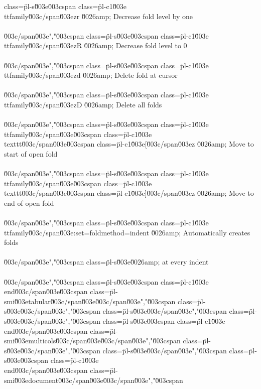 class=\"pl-s\"\u003e\u003cspan class=\"pl-c1\"\u003e\\ttfamily\u003c/span\u003e{zr} \u0026amp; Decrease fold level by one\\\\\u003c/span\u003e","\u003cspan class=\"pl-s\"\u003e\u003cspan class=\"pl-c1\"\u003e\\ttfamily\u003c/span\u003e{zR} \u0026amp; Decrease fold level to 0\\\\\u003c/span\u003e","\u003cspan class=\"pl-s\"\u003e\u003cspan class=\"pl-c1\"\u003e\\ttfamily\u003c/span\u003e{zd} \u0026amp; Delete fold at cursor\\\\\u003c/span\u003e","\u003cspan class=\"pl-s\"\u003e\u003cspan class=\"pl-c1\"\u003e\\ttfamily\u003c/span\u003e{zD} \u0026amp; Delete all folds\\\\\u003c/span\u003e","\u003cspan class=\"pl-s\"\u003e\u003cspan class=\"pl-c1\"\u003e\\ttfamily\u003c/span\u003e{\u003cspan class=\"pl-c1\"\u003e\\texttt\u003c/span\u003e{\u003cspan class=\"pl-c1\"\u003e[\u003c/span\u003e}z} \u0026amp; Move to start of open fold\\\\\u003c/span\u003e","\u003cspan class=\"pl-s\"\u003e\u003cspan class=\"pl-c1\"\u003e\\ttfamily\u003c/span\u003e{\u003cspan class=\"pl-c1\"\u003e\\texttt\u003c/span\u003e{\u003cspan class=\"pl-c1\"\u003e]\u003c/span\u003e}z} \u0026amp; Move to end of open fold\\\\\u003c/span\u003e","\u003cspan class=\"pl-s\"\u003e\u003cspan class=\"pl-c1\"\u003e\\ttfamily\u003c/span\u003e{:set=foldmethod=indent} \u0026amp; Automatically creates folds\\\\\u003c/span\u003e","\u003cspan class=\"pl-s\"\u003e\u0026amp; at every indent\\\\\u003c/span\u003e","\u003cspan class=\"pl-s\"\u003e\u003cspan class=\"pl-c1\"\u003e\\end\u003c/span\u003e{\u003cspan class=\"pl-smi\"\u003etabular\u003c/span\u003e}\u003c/span\u003e","\u003cspan class=\"pl-s\"\u003e\u003c/span\u003e","\u003cspan class=\"pl-s\"\u003e\u003c/span\u003e","\u003cspan class=\"pl-s\"\u003e\u003c/span\u003e","\u003cspan class=\"pl-s\"\u003e\u003cspan class=\"pl-c1\"\u003e\\end\u003c/span\u003e{\u003cspan class=\"pl-smi\"\u003emulticols\u003c/span\u003e}\u003c/span\u003e","\u003cspan class=\"pl-s\"\u003e\u003c/span\u003e","\u003cspan class=\"pl-s\"\u003e\u003c/span\u003e","\u003cspan class=\"pl-s\"\u003e\u003cspan class=\"pl-c1\"\u003e\\end\u003c/span\u003e{\u003cspan class=\"pl-smi\"\u003edocument\u003c/span\u003e}\u003c/span\u003e","\u003cspan 
